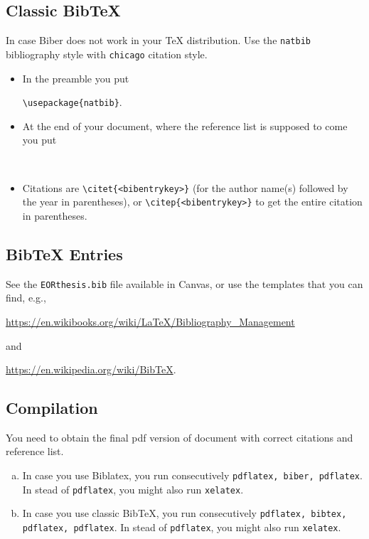 \documentclass[a4paper,11pt]{article}
\theoremstyle{plain}
\theoremstyle{definition}
\begin{document}
\subsection{Classic BibTeX}
In case Biber does not work in your TeX distribution.
Use the \texttt{natbib} bibliography style with \texttt{chicago} citation style.

\begin{itemize}
\item
In the preamble you put

\verb+\usepackage{natbib}+.

\item
At the end of your document, where the reference list is supposed to come you
put

\begin{verbatim}


\end{verbatim}

\item
Citations are \verb+\citet{<bibentrykey>}+ (for the author name(s)
followed by the year in parentheses), or
\verb+\citep{<bibentrykey>}+
to get the entire citation in parentheses.
\end{itemize}

\subsection{BibTeX Entries}\label{ss:bibtex}
See the \texttt{EORthesis.bib} file available in Canvas,
or use the templates that you can find, e.g.,

\url{https://en.wikibooks.org/wiki/LaTeX/Bibliography_Management}

\noindent
and

\url{https://en.wikipedia.org/wiki/BibTeX}.

\subsection{Compilation}
You need to obtain the final pdf version of document with correct citations and reference
list.

\begin{enumerate}[(a).]
\item
In case you use Biblatex, you run consecutively
\texttt{pdflatex, biber, pdflatex}. In stead of
\texttt{pdflatex}, you might also run \texttt{xelatex}.
\item
In case you use classic BibTeX, you run consecutively
\texttt{pdflatex, bibtex, pdflatex, pdflatex}. In stead of
\texttt{pdflatex}, you might also run \texttt{xelatex}.
\end{enumerate}
\end{document}
